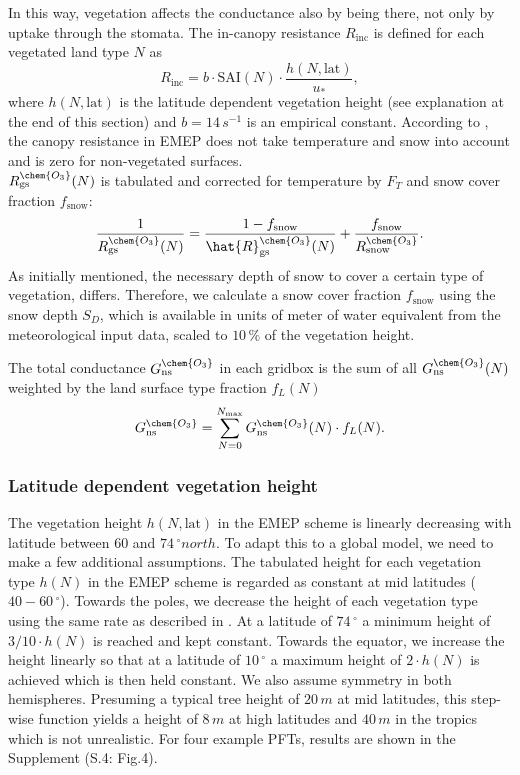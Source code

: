 \documentclass[gmd, manuscript]{copernicus}
\begin{document}
In this way, vegetation affects the conductance also by being there, not only by uptake through the stomata. The in-canopy resistance $R_\text{inc}$ is defined for each vegetated land type $N$ as
\begin{equation}
  R_\text{inc} = b \cdot \text{SAI}(N) \cdot \frac{h(N, \text{lat})}{u_*},
\end{equation}
where $h(N, \text{lat})$ is the latitude dependent vegetation height (see explanation at the end of this section) and $b = 14\,\unit{s^{-1}}$ is an empirical constant. According to \citet{ACP:Simpson2012}, the canopy resistance in EMEP does not take temperature and snow into account and is zero for non-vegetated surfaces.\\
$R_\text{gs}^\chem{O_3}(N)$ is tabulated and corrected for temperature by $F_T$ and snow cover fraction $f_\text{snow}$:
\begin{equation}
  \frac{1}{R_\text{gs}^\chem{O_3}(N)} = \frac{1-f_\text{snow}}{\hat{R}_\text{gs}^\chem{O_3}(N)} + \frac{f_\text{snow}}{R_\text{snow}^\chem{O_3}}.
\end{equation}
As initially mentioned, the necessary depth of snow to cover a certain type of vegetation, differs. Therefore, we calculate a snow cover fraction $f_\text{snow}$ using the snow depth $S_D$, which is available in units of meter of water equivalent from the meteorological input data, scaled to $10\,\unit{\%}$ of the vegetation height.

The total conductance $G_\text{ns}^\chem{O_3}$ in each gridbox is the sum of all $G_\text{ns}^\chem{O_3}(N)$ weighted by the land surface type fraction $f_L(N)$
\begin{equation}
  G_\text{ns}^\chem{O_3} = \sum_{N=0}^{N_\text{max}}{G_\text{ns}^\chem{O_3}(N) \cdot f_L(N)}.
\end{equation}

\subsubsection*{Latitude dependent vegetation height}
The vegetation height $h(N, \text{lat})$ in the EMEP scheme is linearly decreasing with latitude between $60$ and $74\,\unit{^\circ north}$. To adapt this to a global model, we need to make a few additional assumptions. The tabulated height for each vegetation type $h(N)$ in the EMEP scheme is regarded as constant at mid latitudes ($40-60\,\unit{^\circ}$). Towards the poles, we decrease the height of each vegetation type using the same rate as described in \citet{ACP:Simpson2012}. At a latitude of $74\,\unit{^\circ}$ a minimum height of $3/10 \cdot h(N)$ is reached and kept constant. Towards the equator, we increase the height linearly so that at a latitude of $10\,\unit{^\circ}$ a maximum height of $2 \cdot h(N)$ is achieved which is then held constant. We also assume symmetry in both hemispheres. Presuming a typical tree height of $20\,\unit{m}$ at mid latitudes, this step-wise function yields a height of $8\,\unit{m}$ at high latitudes and $40\,\unit{m}$ in the tropics which is not unrealistic. For four example PFTs, results are shown in the Supplement (S.4: Fig.4). 
\end{document}
